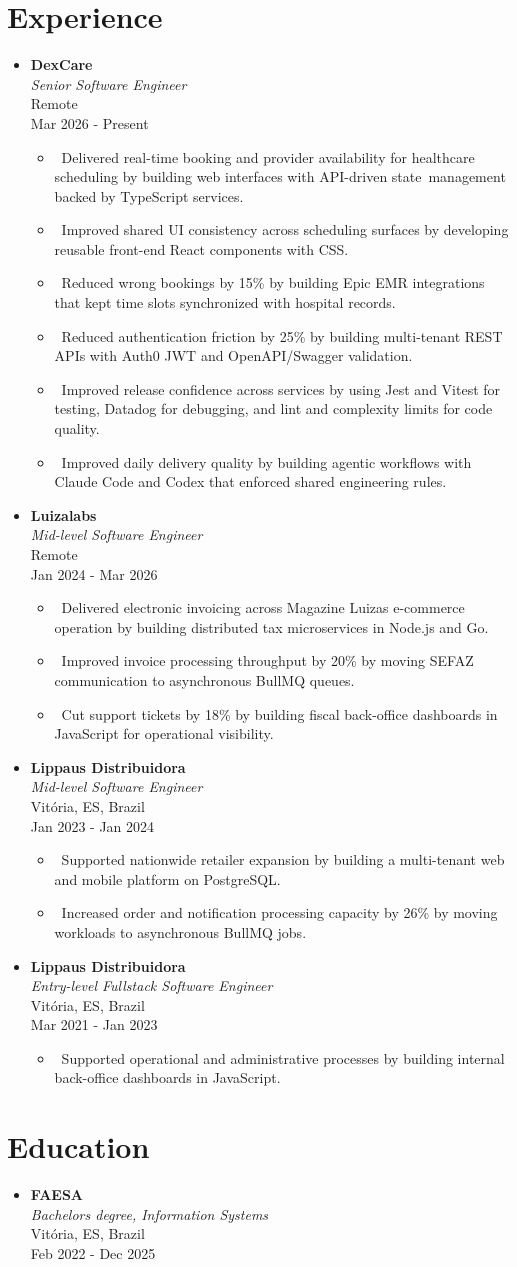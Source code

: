 \documentclass[letterpaper,10pt]{article}
\newcommand{\resumeItem}[1]{\item\small{#1}}
\newcommand{\resumeSubheading}[4]{
\item
  \textbf{#1}\\[-1pt]
  \textit{#3}\\[-1pt]
  \small #4\\[-1pt]
  \small #2\vspace{3pt}
}
\newcommand{\resumeSubHeadingList}{\begin{itemize}[leftmargin=0.15in, label={}, nosep]}
\newcommand{\resumeSubHeadingListEnd}{\end{itemize}}
\newcommand{\resumeRoleGap}{\vspace{4pt}}
\begin{document}
\section{Experience}
\resumeSubHeadingList
  \resumeSubheading
      {DexCare}{Mar 2026 - Present}
      {Senior Software Engineer}{Remote}
      \resumeSubHeadingList
          \resumeItem{\textbullet\ Delivered real-time booking and provider availability for healthcare scheduling by building web interfaces with API-driven state~management backed by TypeScript services.}
          \resumeItem{\textbullet\ Improved shared UI consistency across scheduling surfaces by developing reusable front-end React components with CSS.}
          \resumeItem{\textbullet\ Reduced wrong bookings by 15\% by building Epic EMR integrations that kept time slots synchronized with hospital records.}
          \resumeItem{\textbullet\ Reduced authentication friction by 25\% by building multi-tenant REST APIs with Auth0 JWT and OpenAPI/Swagger validation.}
          \resumeItem{\textbullet\ Improved release confidence across services by using Jest and Vitest for testing, Datadog for debugging, and lint and complexity limits for code quality.}
          \resumeItem{\textbullet\ Improved daily delivery quality by building agentic workflows with Claude Code and Codex that enforced shared engineering rules.}
      \resumeSubHeadingListEnd
  \resumeRoleGap
  \resumeSubheading
      {Luizalabs}{Jan 2024 - Mar 2026}
      {Mid-level Software Engineer}{Remote}
      \resumeSubHeadingList
          \resumeItem{\textbullet\ Delivered electronic invoicing across Magazine Luiza\textquotesingle{}s e-commerce operation by building distributed tax microservices in Node.js and Go.}
          \resumeItem{\textbullet\ Improved invoice processing throughput by 20\% by moving SEFAZ communication to asynchronous BullMQ queues.}
          \resumeItem{\textbullet\ Cut support tickets by 18\% by building fiscal back-office dashboards in JavaScript for operational visibility.}
      \resumeSubHeadingListEnd
  \resumeRoleGap
  \resumeSubheading
      {Lippaus Distribuidora}{Jan 2023 - Jan 2024}
      {Mid-level Software Engineer}{Vit\'oria, ES, Brazil}
      \resumeSubHeadingList
          \resumeItem{\textbullet\ Supported nationwide retailer expansion by building a multi-tenant web and mobile platform on PostgreSQL.}
          \resumeItem{\textbullet\ Increased order and notification processing capacity by 26\% by moving workloads to asynchronous BullMQ jobs.}
      \resumeSubHeadingListEnd
  \resumeRoleGap
  \resumeSubheading
      {Lippaus Distribuidora}{Mar 2021 - Jan 2023}
      {Entry-level Fullstack Software Engineer}{Vit\'oria, ES, Brazil}
      \resumeSubHeadingList
          \resumeItem{\textbullet\ Supported operational and administrative processes by building internal back-office dashboards in JavaScript.}
      \resumeSubHeadingListEnd
\resumeSubHeadingListEnd

\resumeRoleGap
\section{Education}
\resumeSubHeadingList
  \resumeSubheading
      {FAESA}{Feb 2022 - Dec 2025}
      {Bachelor\textquotesingle{}s degree, Information Systems}{Vit\'oria, ES, Brazil}
\resumeSubHeadingListEnd
\end{document}
